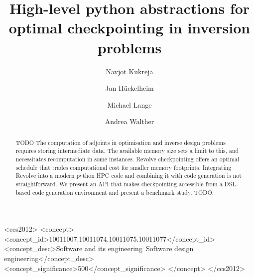 \documentclass[sigconf]{acmart}
\begin{document}
\title{High-level python abstractions for optimal checkpointing in inversion problems}


\author{Navjot Kukreja}
\author{Jan H\"uckelheim}
\author{Michael Lange}
\author{Andrea Walther}

\renewcommand\shortauthors{Kukreja, N. et al}

\begin{abstract} TODO
The computation of adjoints in optimisation and inverse design problems requires storing intermediate data. The available memory size sets a limit to this, and necessitates recomputation in some instances. Revolve checkpointing offers an optimal schedule that trades computational cost for smaller memory footprints. Integrating Revolve into a modern python HPC code and combining it with code generation is not straightforward. We present an API that makes checkpointing accessible from a DSL-based code generation environment and present a benchmark study. TODO.
\end{abstract}

%
%
\begin{CCSXML}
<ccs2012>
<concept>
<concept_id>10011007.10011074.10011075.10011077</concept_id>
<concept_desc>Software and its engineering~Software design engineering</concept_desc>
<concept_significance>500</concept_significance>
</concept>
</ccs2012>
\end{CCSXML}

%
%




\maketitle
\end{document}
